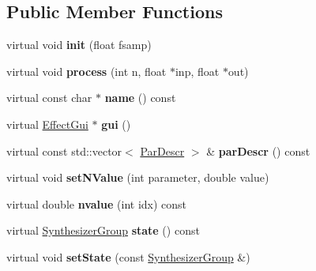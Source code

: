 \subsection*{Public Member Functions}
\begin{DoxyCompactItemize}
\item 
\mbox{\label{class_ms_1_1_compressor_aa3bebc8b77bf7dd7e8630ff783d3c0ea}} 
virtual void {\bfseries init} (float fsamp)
\item 
\mbox{\label{class_ms_1_1_compressor_a57cd008ed347a866b3f7b183b79772e2}} 
virtual void {\bfseries process} (int n, float $\ast$inp, float $\ast$out)
\item 
\mbox{\label{class_ms_1_1_compressor_a83947f7a007253e7c9f8432e0ccbd4ae}} 
virtual const char $\ast$ {\bfseries name} () const
\item 
\mbox{\label{class_ms_1_1_compressor_ac33c5a96b6bee1afbf3003f67c3409f0}} 
virtual \hyperlink{class_ms_1_1_effect_gui}{Effect\+Gui} $\ast$ {\bfseries gui} ()
\item 
\mbox{\label{class_ms_1_1_compressor_a5592b342de634fcdddde8607b7b6830f}} 
virtual const std\+::vector$<$ \hyperlink{struct_ms_1_1_par_descr}{Par\+Descr} $>$ \& {\bfseries par\+Descr} () const
\item 
\mbox{\label{class_ms_1_1_compressor_a91bbf98889e72111bab14f5e1dba2d84}} 
virtual void {\bfseries set\+N\+Value} (int parameter, double value)
\item 
\mbox{\label{class_ms_1_1_compressor_ad404be7d4e414f8f3a918f561fcf540a}} 
virtual double {\bfseries nvalue} (int idx) const
\item 
\mbox{\label{class_ms_1_1_compressor_abb3857b43f86cfab683262d646b8d2fc}} 
virtual \hyperlink{class_ms_1_1_synthesizer_group}{Synthesizer\+Group} {\bfseries state} () const
\item 
\mbox{\label{class_ms_1_1_compressor_ae68f165200a621eb317277239c7d1c39}} 
virtual void {\bfseries set\+State} (const \hyperlink{class_ms_1_1_synthesizer_group}{Synthesizer\+Group} \&)
\end{DoxyCompactItemize}
